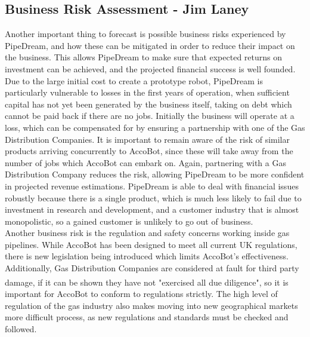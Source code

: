 \documentclass[11pt]{article}		%
\newcommand{\supercite}[1]{\textsuperscript{\cite{#1}}}		%
\begin{document}
           
			    
		\subsection[Business Risk Assessment]{Business Risk Assessment - Jim Laney}
		
 	        \begin{floatingfigure}[r]{0pt} \end{floatingfigure}
	     	Another important thing to forecast is possible business risks experienced by PipeDream, and how these can be mitigated in order to reduce their impact on the business.
	     	This allows PipeDream to make sure that expected returns on investment can be achieved, and the projected financial success is well founded.
	     	\\ 
            \hspace*{2ex}Due to the large initial cost to create a prototype robot, PipeDream is particularly vulnerable to losses in the first years of operation, when sufficient capital has not yet been generated by the business itself, taking on debt which cannot be paid back if there are no jobs.
	     	Initially the business will operate at a loss, which can be compensated for by ensuring a partnership with one of the Gas Distribution Companies.
	     	It is important to remain aware of the risk of similar products arriving concurrently to AccoBot, since these will take away from the number of jobs which AccoBot can embark on.
	     	Again, partnering with a Gas Distribution Company reduces the risk, allowing PipeDream to be more confident in projected revenue estimations.
	     	PipeDream is able to deal with financial issues robustly because there is a single product, which is much less likely to fail due to investment in research and development, and a customer industry that is almost monopolistic, so a gained customer is unlikely to go out of business.
	     	\\ 
            \hspace*{2ex}Another business risk is the regulation and safety concerns working inside gas pipelines.
	     	While AccoBot has been designed to meet all current UK regulations, there is new legislation being introduced which limits AccoBot's effectiveness.
	     	Additionally, Gas Distribution Companies are considered at fault for third party damage, if it can be shown they have not "exercised all due diligence"\supercite{hse1996guide}, so it is important for AccoBot to conform to regulations strictly.
	     	The high level of regulation of the gas industry also makes moving into new geographical markets more difficult process, as new regulations and standards must be checked and followed.
\end{document}
